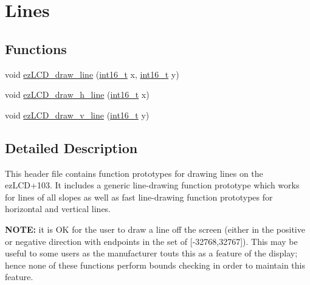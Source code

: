 \hypertarget{group__ez_l_c_d__103__lines}{\section{Lines}
\label{group__ez_l_c_d__103__lines}
}
\subsection*{Functions}
\begin{DoxyCompactItemize}
\item 
void \hyperlink{group__ez_l_c_d__103__lines_ga35a1badf801e1e575e85f37b9aab365f}{ez\-L\-C\-D\-\_\-draw\-\_\-line} (\hyperlink{group__ez_l_c_d__103__common_ga932e6ccc3d54c58f761c1aead83bd6d7}{int16\-\_\-t} x, \hyperlink{group__ez_l_c_d__103__common_ga932e6ccc3d54c58f761c1aead83bd6d7}{int16\-\_\-t} y)
\item 
void \hyperlink{group__ez_l_c_d__103__lines_ga6d20c01026cf57b48587645181d4acd6}{ez\-L\-C\-D\-\_\-draw\-\_\-h\-\_\-line} (\hyperlink{group__ez_l_c_d__103__common_ga932e6ccc3d54c58f761c1aead83bd6d7}{int16\-\_\-t} x)
\item 
void \hyperlink{group__ez_l_c_d__103__lines_gaf9a751e9cf10f52c13e428b8f5f30761}{ez\-L\-C\-D\-\_\-draw\-\_\-v\-\_\-line} (\hyperlink{group__ez_l_c_d__103__common_ga932e6ccc3d54c58f761c1aead83bd6d7}{int16\-\_\-t} y)
\end{DoxyCompactItemize}


\subsection{Detailed Description}
This header file contains function prototypes for drawing lines on the ez\-L\-C\-D+103. It includes a generic line-\/drawing function prototype which works for lines of all slopes as well as fast line-\/drawing function prototypes for horizontal and vertical lines. \par
\par
 {\bfseries N\-O\-T\-E\-:} it is O\-K for the user to draw a line off the screen (either in the positive or negative direction with endpoints in the set of \mbox{[}-\/32768,32767\mbox{]}). This may be useful to some users as the manufacturer touts this as a feature of the display; hence none of these functions perform bounds checking in order to maintain this feature. 

